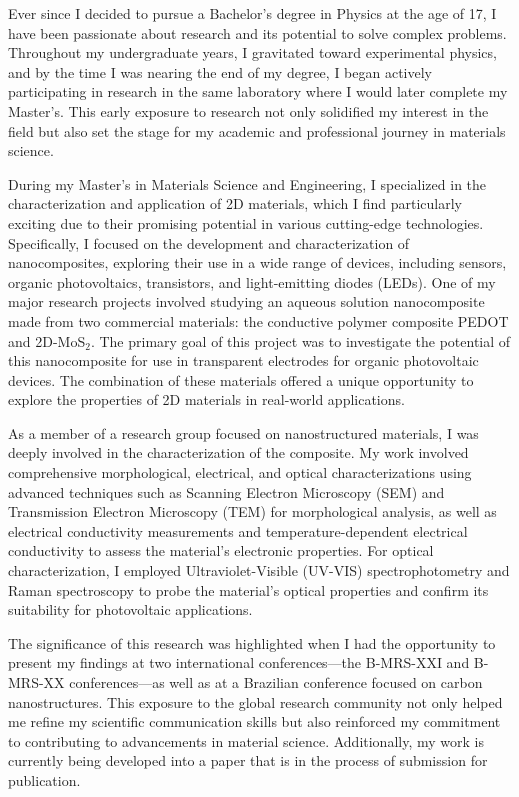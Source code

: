 \documentclass{article}
\begin{document}

Ever since I decided to pursue a Bachelor's degree in Physics at the age of 17, I have been passionate about research and its potential to solve complex problems. Throughout my undergraduate years, I gravitated toward experimental physics, and by the time I was nearing the end of my degree, I began actively participating in research in the same laboratory where I would later complete my Master's. This early exposure to research not only solidified my interest in the field but also set the stage for my academic and professional journey in materials science.

During my Master's in Materials Science and Engineering, I specialized in the characterization and application of 2D materials, which I find particularly exciting due to their promising potential in various cutting-edge technologies. Specifically, I focused on the development and characterization of nanocomposites, exploring their use in a wide range of devices, including sensors, organic photovoltaics, transistors, and light-emitting diodes (LEDs). One of my major research projects involved studying an aqueous solution nanocomposite made from two commercial materials: the conductive polymer composite PEDOT
and 2D-MoS$_2$. The primary goal of this project was to investigate the potential of this nanocomposite for use in transparent electrodes for organic photovoltaic devices. The combination of these materials offered a unique opportunity to explore the properties of 2D materials in real-world applications.

As a member of a research group focused on nanostructured materials, I was deeply involved in the characterization of the composite. My work involved comprehensive morphological, electrical, and optical characterizations using advanced techniques such as Scanning Electron Microscopy (SEM) and Transmission Electron Microscopy (TEM) for morphological analysis, as well as electrical conductivity measurements and temperature-dependent electrical conductivity to assess the material's electronic properties. For optical characterization, I employed Ultraviolet-Visible (UV-VIS) spectrophotometry and Raman spectroscopy to probe the material's optical properties and confirm its suitability for photovoltaic applications.

The significance of this research was highlighted when I had the opportunity to present my findings at two international conferences—the B-MRS-XXI and B-MRS-XX conferences—as well as at a Brazilian conference focused on carbon nanostructures. This exposure to the global research community not only helped me refine my scientific communication skills but also reinforced my commitment to contributing to advancements in material science. Additionally, my work is currently being developed into a paper that is in the process of submission for publication.
\end{document}
